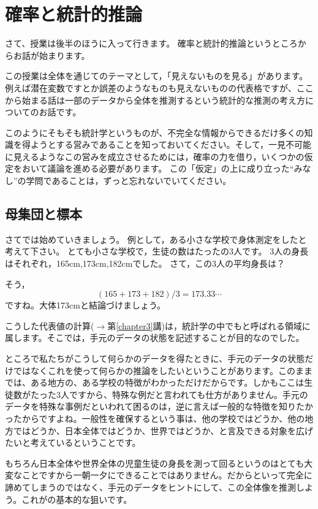 \documentclass{ltjsbook}
\begin{document}
\chapter{確率と統計的推論}
\label{chapter16}
さて、授業は後半のほうに入って行きます。
確率と統計的推論というところからお話が始まります。

この授業は全体を通じてのテーマとして，「見えないものを見る」があります。
例えば潜在変数ですとか誤差のようなものも見えないものの代表格ですが、ここから始まる話は一部のデータから全体を推測するという統計的な推測の考え方についてのお話です。

このようにそもそも統計学というものが、不完全な情報からできるだけ多くの知識を得ようとする営みであることを知っておいてください。そして，一見不可能に見えるようなこの営みを成立させるためには，確率の力を借り，いくつかの仮定をおいて議論を進める必要があります。
この「仮定」の上に成り立った``みなし''の学問であることは，ずっと忘れないでいてください。

\section{母集団と標本}
さてでは始めていきましょう。
例として，ある小さな学校で身体測定をしたと考えて下さい。
とても小さな学校で，生徒の数はたったの3人です。
3人の身長はそれぞれ，165cm,173cm,182cmでした。
さて，この3人の平均身長は？ 

そう，
\[ (165+173+182)/3=173.33\cdots\]
ですね。大体173cmと結論づけましょう。

こうした代表値の計算($\to$第\ref{chapter3}講)は，統計学の中でもと呼ばれる領域に属します。そこでは，手元のデータの状態を記述することが目的なのでした。

ところで私たちがこうして何らかのデータを得たときに、手元のデータの状態だけではなくこれを使って何らかの推論をしたいということがあります。このままでは、ある地方の、ある学校の特徴がわかっただけだからです。しかもここは生徒数がたった3人ですから、特殊な例だと言われても仕方がありません。手元のデータを特殊な事例だといわれて困るのは，逆に言えば一般的な特徴を知りたかったからですよね。一般性を確保するという事は、他の学校ではどうか、他の地方ではどうか、日本全体ではどうか、世界ではどうか、と言及できる対象を広げたいと考えているということです。

もちろん日本全体や世界全体の児童生徒の身長を測って回るというのはとても大変なことですから一朝一夕にできることではありません。だからといって完全に諦めてしまうのではなく、手元のデータをヒントにして、この全体像を推測しよう。これがの基本的な狙いです。
\end{document}
